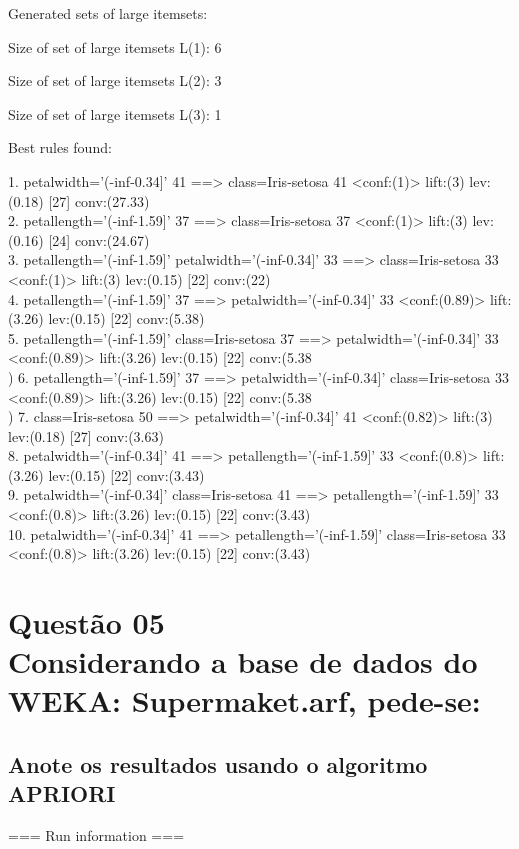 \documentclass[12pt]{article}
\begin{document}
Generated sets of large itemsets:

Size of set of large itemsets L(1): 6

Size of set of large itemsets L(2): 3

Size of set of large itemsets L(3): 1

Best rules found:

 1. petalwidth='(-inf-0.34]' 41 ==> class=Iris-setosa 41    <conf:(1)> lift:(3) lev:(0.18) [27] conv:(27.33)\\
 2. petallength='(-inf-1.59]' 37 ==> class=Iris-setosa 37    <conf:(1)> lift:(3) lev:(0.16) [24] conv:(24.67)\\
 3. petallength='(-inf-1.59]' petalwidth='(-inf-0.34]' 33 ==> class=Iris-setosa 33    <conf:(1)> lift:(3) lev:(0.15) [22] conv:(22)\\
 4. petallength='(-inf-1.59]' 37 ==> petalwidth='(-inf-0.34]' 33    <conf:(0.89)> lift:(3.26) lev:(0.15) [22] conv:(5.38)\\
 5. petallength='(-inf-1.59]' class=Iris-setosa 37 ==> petalwidth='(-inf-0.34]' 33    <conf:(0.89)> lift:(3.26) lev:(0.15) [22] conv:(5.38\\)
 6. petallength='(-inf-1.59]' 37 ==> petalwidth='(-inf-0.34]' class=Iris-setosa 33    <conf:(0.89)> lift:(3.26) lev:(0.15) [22] conv:(5.38\\)
 7. class=Iris-setosa 50 ==> petalwidth='(-inf-0.34]' 41    <conf:(0.82)> lift:(3) lev:(0.18) [27] conv:(3.63)\\
 8. petalwidth='(-inf-0.34]' 41 ==> petallength='(-inf-1.59]' 33    <conf:(0.8)> lift:(3.26) lev:(0.15) [22] conv:(3.43)\\
 9. petalwidth='(-inf-0.34]' class=Iris-setosa 41 ==> petallength='(-inf-1.59]' 33    <conf:(0.8)> lift:(3.26) lev:(0.15) [22] conv:(3.43)\\
10. petalwidth='(-inf-0.34]' 41 ==> petallength='(-inf-1.59]' class=Iris-setosa 33    <conf:(0.8)> lift:(3.26) lev:(0.15) [22] conv:(3.43)\\



\section{Questão 05\\
  Considerando a base de dados do WEKA: Supermaket.arf, pede-se:
 }
\subsection{Anote os resultados usando o algoritmo APRIORI}
=== Run information ===
\end{document}
